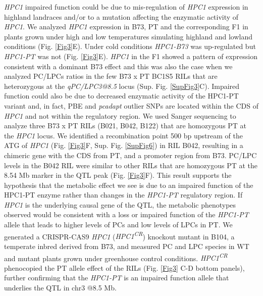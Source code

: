 \documentclass[9pt,twocolumn,twoside,lineno]{BioRxiv}
\begin{document}
\textit{HPC1} impaired function could be due to mis-regulation of \textit{HPC1} expression in highland landraces and/or to a mutation affecting the enzymatic activity of \textit{HPC1}. 
We analyzed \textit{HPC1} expression in B73, PT and the corresponding F1 in plants grown under high and low temperatures simulating highland and lowland conditions (Fig. \ref{Fig3}E). 
Under cold conditions \textit{HPC1-B73} was up-regulated but \textit{HPC1-PT} was not (Fig. \ref{Fig3}E). 
\textit{HPC1} in the F1 showed a pattern of expression consistent with a dominant B73 effect and this was also the case when we analyzed PC/LPCs ratios in the few B73 x PT BC1S5 RILs that are heterozygous at the \textit{qPC/LPC3@8.5} locus (Sup. Fig. \ref{SupFig3}C).
Impaired function could also be due to decreased enzymatic activity of the HPC1-PT variant and, in fact, PBE and \textit{pcadapt} outlier SNPs are located within the CDS of \textit{HPC1} and not within the regulatory region. 
We used Sanger sequencing to analyze three B73 x PT RILs (B021, B042, B122) that are homozygous PT at the \textit{HPC1} locus.
We identified a recombination point 500 bp upstream of the ATG of \textit{HPC1} (Fig. \ref{Fig3}F, Sup. Fig. \ref{SupFig6}) in RIL B042, resulting in a chimeric gene with the CDS from PT, and a promoter region from B73.
PC/LPC levels in the B042 RIL were similar to other RILs that are homozygous PT at the 8.54 Mb marker in the QTL peak (Fig. \ref{Fig3}F). 
This result supports the hypothesis that the metabolic effect we see is due to an impaired function of the HPC1-PT enzyme rather than changes in the \textit{HPC1-PT} regulatory region.
If \textit{HPC1} is the underlying causal gene of the QTL, the metabolic phenotypes observed would be consistent with a loss or impaired function of the \textit{HPC1-PT} allele that leads to higher levels of PCs and low levels of LPCs in PT. 
We generated a CRISPR-CAS9 \textit{HPC1} (\textit{HPC1\textsuperscript{CR}}) knockout mutant in B104, a temperate inbred derived from B73, and measured PC and LPC species in WT and mutant plants grown under greenhouse control conditions. 
\textit{HPC1\textsuperscript{CR}} phenocopied the PT allele effect of the RILs (Fig. \ref{Fig3} C-D bottom panels), further confirming that the \textit{HPC1-PT} is an impaired function allele that underlies the QTL in chr3 @8.5 Mb. 
\end{document}
